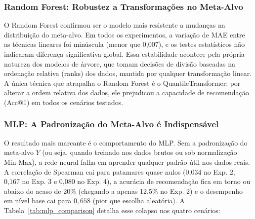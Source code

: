 \documentclass[12pt]{article}
\begin{document}
\subsubsection{Random Forest: Robustez a Transformações no Meta-Alvo}

O Random Forest confirmou ser o modelo mais resistente a mudanças na distribuição do meta-alvo. Em todos os experimentos, a variação de MAE entre as técnicas lineares foi minúscula (menor que 0,007), e os testes estatísticos não indicaram diferença significativa global. Essa estabilidade acontece pela própria natureza dos modelos de árvore, que tomam decisões de divisão baseadas na ordenação relativa (ranks) dos dados, mantida por qualquer transformação linear. A única técnica que atrapalha o Random Forest é o QuantileTransformer: por alterar a ordem relativa dos dados, ele prejudicou a capacidade de recomendação (Acc@1) em todos os cenários testados.

\subsubsection{MLP: A Padronização do Meta-Alvo é Indispensável}
\label{subsec:analise_mlp}

O resultado mais marcante é o comportamento do MLP. Sem a padronização do meta-alvo $Y$ (ou seja, quando treinado nos dados brutos ou sob normalização Min-Max), a rede neural falha em aprender qualquer padrão útil nos dados reais. A correlação de Spearman cai para patamares quase nulos (0,034 no Exp. 2, 0,167 no Exp. 3 e 0,080 no Exp. 4), a acurácia de recomendação fica em torno ou abaixo do acaso de 20\% (chegando a apenas 12,5\% no Exp. 2) e o desempenho em nível base cai para $0{,}658$ (pior que escolha aleatória). A Tabela~\ref{tab:mlp_comparison} detalha esse colapso nos quatro cenários:
\end{document}

